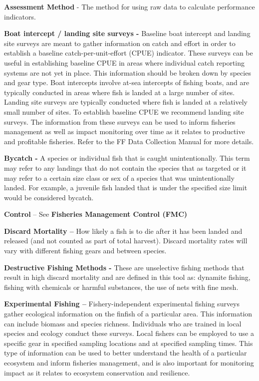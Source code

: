 \documentclass[]{book}
\begin{document}
\textbf{Assessment Method} - The method for using raw data to calculate
performance indicators.

\textbf{Boat intercept / landing site surveys -} Baseline boat intercept
and landing site surveys are meant to gather information on catch and
effort in order to establish a baseline catch-per-unit-effort (CPUE)
indicator. These surveys can be useful in establishing baseline CPUE in
areas where individual catch reporting systems are not yet in place.
This information should be broken down by species and gear type. Boat
intercepts involve at-sea intercepts of fishing boats, and are typically
conducted in areas where fish is landed at a large number of sites.
Landing site surveys are typically conducted where fish is landed at a
relatively small number of sites. To establish baseline CPUE we
recommend landing site surveys. The information from these surveys can
be used to inform fisheries management as well as impact monitoring over
time as it relates to productive and profitable fisheries. Refer to the
FF Data Collection Manual for more details.

\textbf{Bycatch -} A species or individual fish that is caught
unintentionally. This term may refer to any landings that do not contain
the species that as targeted or it may refer to a certain size class or
sex of a species that was unintentionally landed. For example, a
juvenile fish landed that is under the specified size limit would be
considered bycatch.

\textbf{Control} -- See \textbf{Fisheries Management Control (FMC)}

\textbf{Discard Mortality --} How likely a fish is to die after it has
been landed and released (and not counted as part of total harvest).
Discard mortality rates will vary with different fishing gears and
between species.

\textbf{Destructive Fishing Methods -} These are unselective fishing
methods that result in high discard mortality and are defined in this
tool as: dynamite fishing, fishing with chemicals or harmful substances,
the use of nets with fine mesh.

\textbf{Experimental Fishing --} Fishery-independent experimental
fishing surveys gather ecological information on the finfish of a
particular area. This information can include biomass and species
richness. Individuals who are trained in local species and ecology
conduct these surveys. Local fishers can be employed to use a specific
gear in specified sampling locations and at specified sampling times.
This type of information can be used to better understand the health of
a particular ecosystem and inform fisheries management, and is also
important for monitoring impact as it relates to ecosystem conservation
and resilience.
\end{document}
